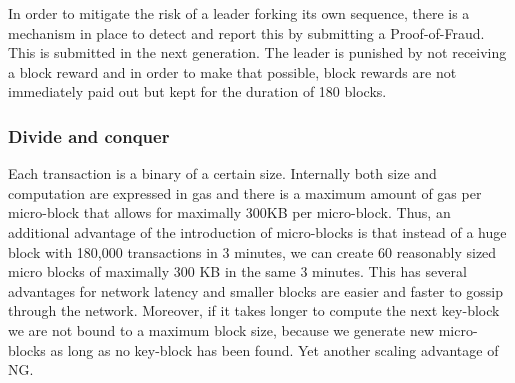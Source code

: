In order to mitigate the risk of a leader forking its own sequence,
there is a mechanism in place to detect and report this by submitting
a Proof-of-Fraud. This is submitted in the next
generation. The leader is punished by not receiving a block reward and
in order to make that possible, block rewards are not immediately paid out but kept for
the duration of 180 blocks.

\subsubsection{Divide and conquer}

Each transaction is a binary of a certain size. Internally both size
and computation are expressed in gas and there is a maximum amount of
gas per micro-block that allows for maximally 300KB per micro-block.
Thus, an additional advantage of the introduction of micro-blocks is that
instead of a huge block with 180,000 transactions in 3 minutes, we can create 60
reasonably sized micro blocks of maximally 300 KB  in the same 3
minutes. This has several advantages for network latency and
smaller blocks are easier and faster to gossip through the
network. Moreover, if it takes longer to compute the next key-block we
are not bound to a maximum block size, because we generate new
micro-blocks as long as no key-block has been found. Yet another
scaling advantage of NG.
